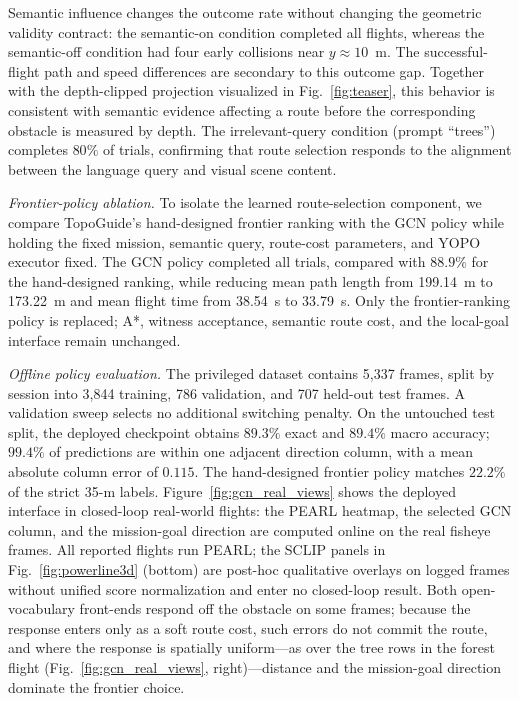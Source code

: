 \documentclass[letterpaper,10pt,conference]{ieeeconf}
\begin{document}
Semantic influence changes the outcome rate without changing the geometric
validity contract: the semantic-on condition completed all flights,
whereas the semantic-off condition had four early collisions near
$y\approx10$~m.  The
successful-flight path and speed differences are secondary to this outcome
gap.  Together with the
depth-clipped projection visualized in Fig.~\ref{fig:teaser}, this behavior
is consistent
with semantic evidence affecting a route before the corresponding obstacle is
measured by depth.
The irrelevant-query condition (prompt ``trees'') completes $80\%$ of trials,
confirming that route selection responds to the alignment between the language
query and visual scene content.

\emph{Frontier-policy ablation.}  To isolate the learned route-selection component, we compare TopoGuide's
hand-designed frontier ranking with the GCN policy while
holding the fixed mission, semantic query, route-cost parameters, and YOPO
executor fixed.
The GCN policy completed all trials, compared with $88.9\%$ for the
hand-designed ranking, while reducing mean path length from 199.14~m to
173.22~m and mean flight time from 38.54~s to 33.79~s.  Only the
frontier-ranking policy is replaced; A*, witness acceptance, semantic route
cost, and the local-goal interface remain unchanged.

\emph{Offline policy evaluation.}  The privileged dataset contains 5,337 frames, split by session into 3,844
training, 786 validation, and 707 held-out test frames.  A validation sweep
selects no additional switching penalty.  On
the untouched test split, the deployed checkpoint obtains $89.3\%$ exact and
$89.4\%$ macro accuracy; $99.4\%$ of predictions are within one adjacent
direction column, with a mean absolute column error of $0.115$.  The
hand-designed frontier policy matches $22.2\%$ of the strict 35-m labels.
Figure~\ref{fig:gcn_real_views} shows the deployed interface in
closed-loop real-world flights: the PEARL heatmap, the selected GCN
column, and the mission-goal direction are computed online on the real
fisheye frames.  All reported flights run PEARL; the SCLIP panels in
Fig.~\ref{fig:powerline3d} (bottom) are post-hoc qualitative overlays
on logged frames without unified score normalization and enter no
closed-loop result.  Both open-vocabulary front-ends respond off the
obstacle on some frames; because
the response enters only as a soft route cost, such errors do not
commit the route, and where the response is spatially uniform---as
over the tree rows in the forest flight
(Fig.~\ref{fig:gcn_real_views}, right)---distance and the
mission-goal direction dominate the frontier choice.
\end{document}
